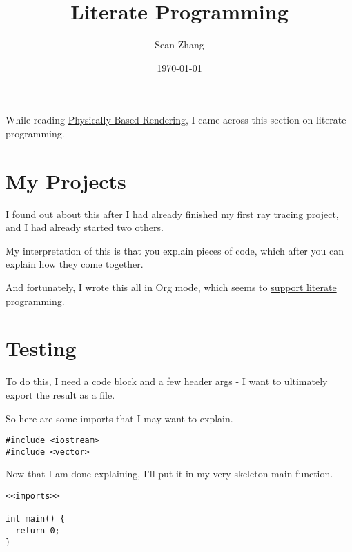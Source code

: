 \documentclass[11pt]{article}
\author{Sean Zhang}
\date{\today}
\title{Literate Programming}
\begin{document}
\maketitle
\tableofcontents

While reading \href{https://www.pbr-book.org/3ed-2018/Introduction/Literate\_Programming}{Physically Based Rendering}, I came across this section on
literate programming.

\section{My Projects}
\label{sec:org465184b}
I found out about this after I had already finished my first ray tracing project,
and I had already started two others.

My interpretation of this is that you explain pieces of code, which after you
can explain how they come together.

And fortunately, I wrote this all in Org mode, which seems to
\href{https://orgmode.org/manual/Extracting-Source-Code.html}{support literate programming}.

\section{Testing}
\label{sec:org561ba03}
To do this, I need a code block and a few header args -
I want to ultimately export the result as a file.

So here are some imports that I may want to explain.
\begin{verbatim}
#include <iostream>
#include <vector>
\end{verbatim}


Now that I am done explaining, I'll put it in my very skeleton main function.
\begin{verbatim}
<<imports>>

int main() {
  return 0;
}
\end{verbatim}
\end{document}

